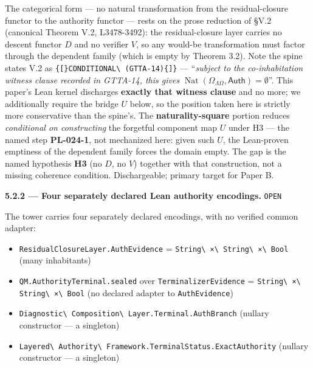\documentclass[
  10pt,
]{article}
\providecommand{\tightlist}{%
  \setlength{\itemsep}{0pt}\setlength{\parskip}{0pt}}
\providecommand{\tightlist}{%
  \setlength{\itemsep}{0pt}\setlength{\parskip}{0pt}}
\DeclareRobustCommand{\texttt}[1]{{\paperSymbolFont\nolinkurl{#1}}}
\begin{document}
The categorical form --- no natural transformation from the residual-closure functor to the authority functor --- rests on the prose reduction of §V.2 (canonical Theorem V.2, L3478-3492): the residual-closure layer carries no descent functor \protect\hypertarget{math-E0060-0112}{}{\(D\)} and no verifier \protect\hypertarget{math-E0061-0113}{}{\(V\)}, so any would-be transformation must factor through the dependent family (which is empty by Theorem 3.2). Note the spine states V.2 as \texttt{{[}CONDITIONAL\ (GTTA-14){]}} --- ``\emph{subject to the co-inhabitation witness clause recorded in GTTA-14, this gives} \protect\hypertarget{math-E0078-0114}{}{\(\operatorname{Nat}(\Omega_{\Lambda\Omega}, \mathsf{Auth}) = \emptyset\)}''. This paper's Lean kernel discharges \textbf{exactly that witness clause} and no more; we additionally require the bridge \protect\hypertarget{math-E0079-0115}{}{\(U\)} below, so the position taken here is strictly more conservative than the spine's. The \textbf{naturality-square} portion reduces \emph{conditional on constructing} the forgetful component map \protect\hypertarget{math-E0079-0116}{}{\(U\)} under H3 --- the named step \textbf{PL-024-1}, not mechanized here: given such \protect\hypertarget{math-E0079-0117}{}{\(U\)}, the Lean-proven emptiness of the dependent family forces the domain empty. The gap is the named hypothesis \textbf{H3} (no \protect\hypertarget{math-E0060-0118}{}{\(D\)}, no \protect\hypertarget{math-E0061-0119}{}{\(V\)}) together with that construction, not a missing coherence condition. Dischargeable; primary target for Paper B.

\textbf{5.2.2 --- Four separately declared Lean authority encodings.} \texttt{OPEN}

The tower carries four separately declared encodings, with no verified common adapter:

\begin{itemize}
\tightlist
\item
  \texttt{ResidualClosureLayer.AuthEvidence} = \texttt{String\ ×\ String\ ×\ Bool} (many inhabitants)
\item
  \texttt{QM.AuthorityTerminal.sealed} over \texttt{TerminalizerEvidence} = \texttt{String\ ×\ String\ ×\ Bool} (no declared adapter to \texttt{AuthEvidence})
\item
  \texttt{Diagnostic\ Composition\ Layer.Terminal.AuthBranch} (nullary constructor --- a singleton)
\item
  \texttt{Layered\ Authority\ Framework.TerminalStatus.ExactAuthority} (nullary constructor --- a singleton)
\end{itemize}
\end{document}
